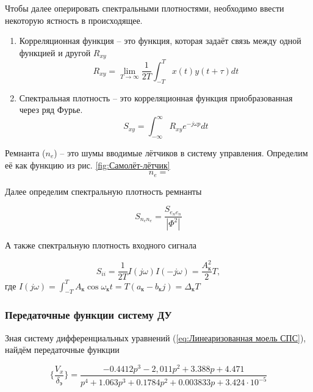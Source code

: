 Чтобы далее оперировать спектральными плотностями, необходимо ввести некоторую ястность в происходящее. 

\begin{enumerate}
    \item Корреляционная функция -- это функция, которая задаёт связь между одной функцией и другой $R_{xy}$
    $$R_{xy} = \lim_{T \to \infty} \frac{1}{2T} \int_{-T}^{T} x(t) y(t+\tau) dt$$
    \item Спектральная плотность -- это корреляционная функция приобразованная через ряд Фурье.
    $$S_{xy} = \int_{-\infty}^{\infty} R_{xy}e^{-j\omega p} dt$$
\end{enumerate}

Ремнанта ($n_e$) -- это шумы вводимые лётчиков в систему управления. Определим её как функцию из рис. {\ref{fig:Самолёт-лётчик}}
\begin{equation}
    \label{eq:Ремнанта}
    n_e = 
\end{equation}

Далее определим спектральную плотность ремнанты 

\begin{equation}
    \label{eq:Спектральная плотность ремнанты}
    S_{n_e n_e} = \frac{S_{e_n e_n}}{|\Phi^2|} 
\end{equation}

А также спектральную плотность входного сигнала

\begin{equation}
    \label{eq:Спектральная плотность входного сигнала}
    S_{ii} = \frac{1}{2T}I(j \omega)I(-j \omega) = \frac{A_\text{к}^2}{2}T,
\end{equation}
где $I(j \omega) = \int_{-T}^{T} A_\text{к} \cos{\omega_\text{к}t} = T(a_\text{к} - b_\text{к}j) = \Delta_\text{к}T$

\subsubsection{Передаточные функции систему ДУ}

Зная систему дифференциальных уравнений ({\ref{eq:Линеаризованная моель СПС}}), найдём передаточные функции 

\begin{equation}
    \label{eq:ПФ по горизонтальной скорости СПС}
    \{ \frac{V_x}{\delta_\text{э}} \} = \frac{-0.4412p^3 - 2,011p^2 + 3.388p + 4.471}{p^4 + 1.063p^3 + 0.1784p^2 + 0.003833p + 3.424 \cdot 10^{-5}}
\end{equation}

